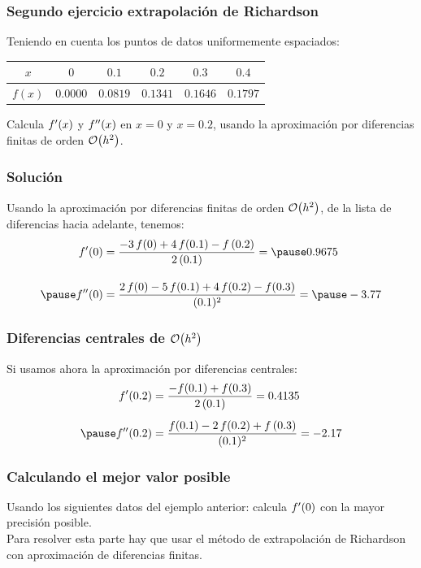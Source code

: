 \documentclass[12pt]{beamer}
\begin{document}
\begin{frame}
\frametitle{Segundo ejercicio extrapolación de Richardson}
Teniendo en cuenta los puntos de datos uniformemente espaciados:
\pause
\begin{table}
\centering
\begin{tabular}{c | c | c | c | c | c }
$x$ & $0$ & $0.1$ & $0.2$ & $0.3$ & $0.4$ \\ \hline
$f (x)$ & $0.0000$ & $0.0819$ & $0.1341$ & $0.1646$ & $0.1797$
\end{tabular}
\end{table}
Calcula ${f}^{\prime} (x)$ y ${f}^{\prime \prime} (x)$ en $x = 0$ y $x = 0.2$, usando la aproximación por diferencias finitas de orden $\order{h^{2}}$.
\end{frame}
\begin{frame}
\frametitle{Solución}
Usando la aproximación por diferencias finitas de orden $\order{h^{2}}$, de la lista de diferencias hacia adelante, tenemos:
\pause 
\begin{eqnarray*}
\begin{aligned}
\pderivada{f} (0) &= \dfrac{-3 \, f (0) + 4 \, f (0.1) - f \, (0.2)}{2 \, (0.1)} = \pause 0.9675 \\[1em] \pause
\sderivada{f} (0) &= \dfrac{2 \, f (0) - 5 \, f (0.1) + 4 \, f (0.2) - f (0.3)}{(0.1)^{2}} =\pause  -3.77
\end{aligned}
\end{eqnarray*}
\end{frame}
\begin{frame}
\frametitle{Diferencias centrales de $\order{h^{2}}$}
Si usamos ahora la aproximación por diferencias centrales:
\pause
\begin{eqnarray*}
\begin{aligned}
\pderivada{f} (0.2) &= \dfrac{-f (0.1) + f (0.3)}{2 \, (0.1)} = 0.4135 \\[0.5em] \pause
\sderivada{f} (0.2) &= \dfrac{f (0.1) - 2 \, f (0.2) + f \, (0.3)}{(0.1)^{2}} = -2.17
\end{aligned}
\end{eqnarray*}
\end{frame}
\begin{frame}
\frametitle{Calculando el mejor valor posible}
Usando los siguientes datos del ejemplo anterior: calcula ${f}^{\prime} (0)$ con la mayor precisión posible.
\\
\medskip
\pause
Para resolver esta parte hay que usar el método de extrapolación de Richardson con aproximación de diferencias finitas.
\end{frame}
\end{document}
